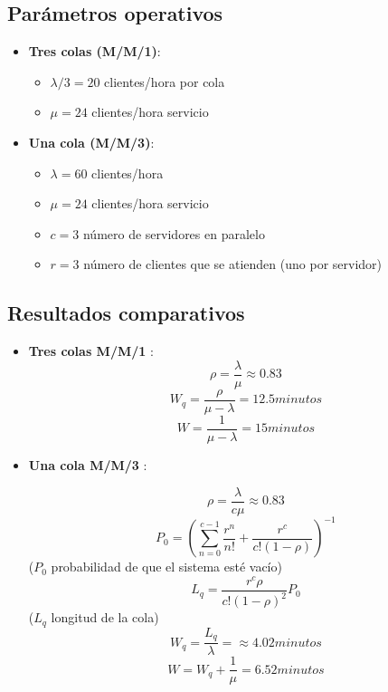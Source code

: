 \documentclass{article}
\begin{document}
\subsection{Parámetros operativos}
\begin{itemize}
    \item \textbf{Tres colas (M/M/1)}:
        \begin{itemize}
            \item $\lambda/3 = 20$ clientes/hora por cola
            \item $\mu = 24$ clientes/hora servicio
        \end{itemize}
    
    \item \textbf{Una cola (M/M/3)}:
        \begin{itemize}
            \item $\lambda = 60$ clientes/hora
            \item $\mu = 24$ clientes/hora servicio
            \item $c = 3$ número de servidores en paralelo
            \item $r = 3$ número de clientes que se atienden (uno por servidor)
        \end{itemize}
\end{itemize}

\subsection{Resultados comparativos}
\begin{itemize}
    \item \textbf{Tres colas M/M/1} \cite{tresColas}:
    \[ \rho = \frac{\lambda}{\mu} \approx 0.83\]
    \[ W_q = \frac{\rho}{\mu - \lambda} = 12.5  minutos \]
    \[ W = \frac{1}{\mu - \lambda} = 15  minutos \]
    
    \item \textbf{Una cola M/M/3} \cite{unaCola}:
    \begin{center}
        \[ \rho = \frac{\lambda}{c \mu} \approx 0.83\]
        \[ P_0 = (\sum_{n = 0}^{c - 1} \frac{r^n}{n!} + \frac{r^c}{c!(1 - \rho)})^{-1}\] ($P_0$ probabilidad de que el sistema esté vacío)
        \[ L_q = \frac{r^c\rho}{c!(1 - \rho)^2}P_0\] ($L_q$ longitud de la cola)
        \[ W_q = \frac{L_q}{\lambda} = \approx 4.02 minutos\]
        \[ W = W_q + \frac{1}{\mu} = 6.52  minutos\]
    \end{center}
\end{itemize}
\end{document}
